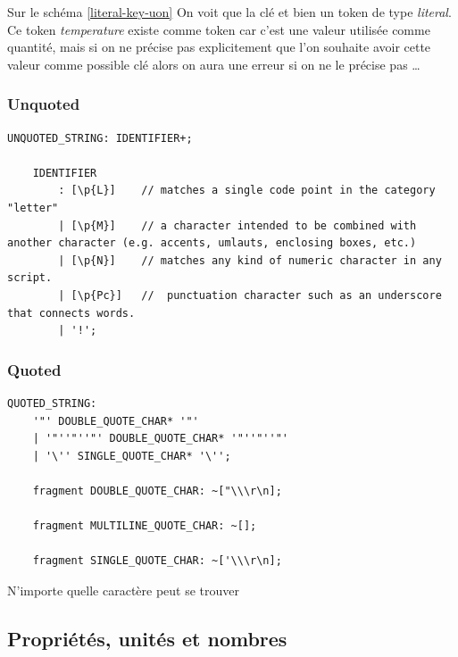 \documentclass[
    iict, %
    il, %
]{heig-tb}
\begin{document}
Sur le schéma \ref*{literal-key-uon} On voit que la clé et bien un token de type \emph{literal}.
Ce token \emph{temperature} existe comme token car c'est une valeur utilisée comme quantité, mais si on ne précise pas explicitement que l'on souhaite avoir cette valeur
comme possible clé alors on aura une erreur si on ne le précise pas \dots %

\subsubsection{Unquoted}

\begin{lstlisting}[frame=single,caption={unquoted},label={unquoted}]
    UNQUOTED_STRING: IDENTIFIER+;

    IDENTIFIER
        : [\p{L}]    // matches a single code point in the category "letter"
        | [\p{M}]    // a character intended to be combined with another character (e.g. accents, umlauts, enclosing boxes, etc.)
        | [\p{N}]    // matches any kind of numeric character in any script.
        | [\p{Pc}]   //  punctuation character such as an underscore that connects words.
        | '!';
\end{lstlisting}


\subsubsection{Quoted}

\begin{lstlisting}[frame=single,caption={quoted},label={quoted}]
    QUOTED_STRING:
    '"' DOUBLE_QUOTE_CHAR* '"'
    | '"''"''"' DOUBLE_QUOTE_CHAR* '"''"''"'
    | '\'' SINGLE_QUOTE_CHAR* '\'';

    fragment DOUBLE_QUOTE_CHAR: ~["\\\r\n];

    fragment MULTILINE_QUOTE_CHAR: ~[];

    fragment SINGLE_QUOTE_CHAR: ~['\\\r\n];
\end{lstlisting}

N'importe quelle caractère peut se trouver


\subsection{Propriétés, unités et nombres}
\end{document}

